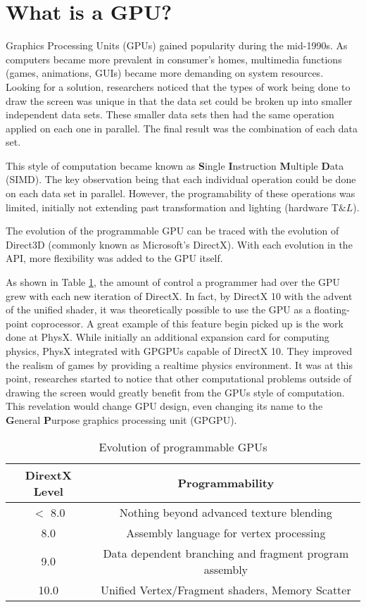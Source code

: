 \section*{What is a GPU?}

Graphics Processing Units (GPUs) gained popularity during the mid-1990s. As computers became more prevalent in consumer's homes, multimedia functions (games, animations, GUIs) became more demanding on system resources. Looking for a solution, researchers noticed that the types of work being done to draw the screen was unique in that the data set could be broken up into smaller independent data sets. These smaller data sets then had the same operation applied on each one in parallel. The final result was the combination of each data set. \cite{emergingtech}

This style of computation became known as \textbf{S}ingle \textbf{I}nstruction \textbf{M}ultiple \textbf{D}ata (SIMD). The key observation being that each individual operation could be done on each data set in parallel. However, the programability of these operations was limited, initially not extending past transformation and lighting (hardware T$\&L$). \cite{emergingtech}

The evolution of the programmable GPU can be traced with the evolution of Direct3D (commonly known as Microsoft's DirectX). With each evolution in the API, more flexibility was added to the GPU itself. 
 
As shown in Table \ref{tab:gpuevolution}, the amount of control a programmer had over the GPU grew with each new iteration of DirectX. In fact, by DirectX 10 with the advent of the unified shader, it was theoretically possible to use the GPU as a floating-point coprocessor. A great example of this feature begin picked up is the work done at PhysX. While initially an additional expansion card for computing physics, PhysX integrated with GPGPUs capable of DirectX 10. They improved the realism of games by providing a realtime physics environment. It was at this point, researches started to notice that other computational problems outside of drawing the screen would greatly benefit from the GPUs style of computation. This revelation would change GPU design, even changing its name to the \textbf{G}eneral \textbf{P}urpose graphics processing unit (GPGPU). \cite{emergingtech}

\begin{table}
	\begin{tabular}{|c|c|}
		\hline
		\textbf{DirextX Level} & \textbf{Programmability} \\
		\hline
		$<$ 8.0 & Nothing beyond advanced texture blending \\
		8.0 & Assembly language for vertex processing \\
		9.0 & Data dependent branching and fragment program assembly\\
		10.0 & Unified Vertex/Fragment shaders, Memory Scatter \\
		\hline
	\end{tabular}
	\caption{Evolution of programmable GPUs \cite{emergingtech}}
	\label{tab:gpuevolution}
\end{table}


